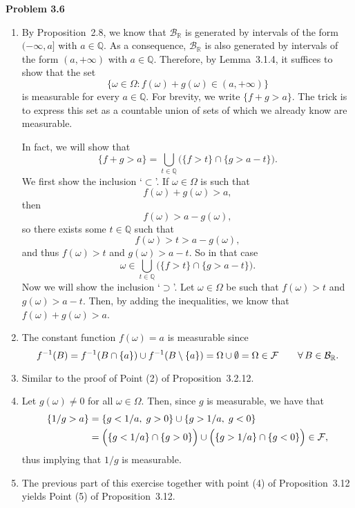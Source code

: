 \textbf{Problem 3.6}
\begin{enumerate}[label=(\alph*)]
	\item By Proposition~2.8, we know that $\mathcal{B}_\mathbb{R}$ is generated by intervals of the form $(-\infty,a]$ with $a \in \mathbb{Q}$. 
As a consequence, $\mathcal{B}_\mathbb{R}$ is also generated by intervals of the form $(a, +\infty)$ with $a \in \mathbb{Q}$.
Therefore, by Lemma~3.1.4, it suffices to show that the set
\[
	\bigl\{ \omega \in \Omega : f(\omega) + g(\omega) \in (a,+\infty) \bigr\}
\]
is measurable for every $a \in \mathbb{Q}$. For brevity, we write $\{ f + g > a\}$. The trick is to express this set as a countable union of sets of which we already know are measurable.

In fact, we will show that
\[
	\{ f + g > a\} = \bigcup_{t \in \mathbb{Q}} \Big(\{ f > t \} \cap \{ g > a - t  \} \Big).
\]
We first show the inclusion `$\subset$'. If $\omega \in \Omega$ is such that
\[
	f(\omega) + g(\omega) > a,
\]
then 
\[
	f(\omega) > a - g(\omega),
\]
so there exists some $t \in \mathbb{Q}$ such that
\[
	f(\omega) > t > a - g(\omega),
\]
and thus $f(\omega) > t$ and $g(\omega) > a - t$.
So in that case
\[
	\omega \in \bigcup_{t \in \mathbb{Q}}\Big(\{ f > t \} \cap \{ g > a - t  \}\Big).
\]
Now we will show the inclusion `$\supset$'. 
Let $\omega \in \Omega$ be such that $f(\omega) > t$ and $g(\omega) > a - t$. 
Then, by adding the inequalities, we know that $f(\omega) + g(\omega) > a$. 

	\item The constant function $f(\omega)=a$ is measurable since 
	\[
		f^{-1}(B) = f^{-1}(B\cap\{a\})\cup f^{-1}(B\setminus \{a\}) = \Omega\cup \emptyset = \Omega\in \mathcal F\qquad\forall\,B\in\mathcal B_{\mathbb R}.
	\]
	
	\item Similar to the proof of Point (2) of Proposition~3.2.12.
	\item Let $g(\omega)\ne 0$ for all $\omega\in\Omega$. Then, since $g$ is measurable, we have that
	\begin{align*}
		\{ 1/g > a\} &= \{ g < 1/a,\;g>0\}\cup \{ g > 1/a,\; g<0\} \\
		&= \Bigl(\{ g < 1/a\}\cap \{g>0\}\Bigr) \cup \Bigl(\{ g > 1/a\}\cap\{g<0\}\Bigr) \in \mathcal F,
	\end{align*}
	thus implying that $1/g$ is measurable.
	
	\item The previous part of this exercise together with point (4) of Proposition~3.12 yields Point (5) of Proposition~3.12.
\end{enumerate}

